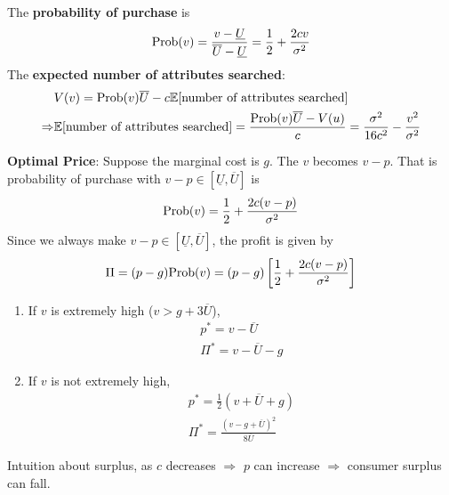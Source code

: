 \documentclass[11pt]{elegantbook}
\begin{document}
The \textbf{probability of purchase} is
\begin{equation}
    \begin{aligned}
        \textnormal{Prob}(v)=\frac{v-\underline{U}}{\overline{U}-\underline{U}}=\frac{1}{2}+\frac{2cv}{\sigma^2}
    \end{aligned}
    \nonumber
\end{equation}
The \textbf{expected number of attributes searched}:
\begin{equation}
    \begin{aligned}
        &V(v)=\textnormal{Prob}(v)\overline{U}-c \mathbb{E}[\textnormal{number of attributes searched}]\\
        \Rightarrow &\mathbb{E}[\textnormal{number of attributes searched}]=\frac{\textnormal{Prob}(v)\overline{U}-V(u)}{c}=\frac{\sigma^2}{16c^2}-\frac{v^2}{\sigma^2}
    \end{aligned}
    \nonumber
\end{equation}

\textbf{Optimal Price}: Suppose the marginal cost is $g$. The $v$ becomes $v-p$. That is probability of purchase with $v-p\in [\underline{U},\overline{U}]$ is
\begin{equation}
    \begin{aligned}
        \textnormal{Prob}(v)=\frac{1}{2}+\frac{2c(v-p)}{\sigma^2}
    \end{aligned}
    \nonumber
\end{equation}
Since we always make $v-p\in [\underline{U},\overline{U}]$, the profit is given by
\begin{equation}
    \begin{aligned}
        \Pi=(p-g)\textnormal{Prob}(v)=(p-g)\left[\frac{1}{2}+\frac{2c(v-p)}{\sigma^2}\right]
    \end{aligned}
    \nonumber
\end{equation}
\begin{enumerate}
    \item If $v$ is extremely high ($v>g+3\overline{U}$),
    \begin{equation}
        \begin{aligned}
            p^*=v-\overline{U}\\
            \Pi^*=v-\overline{U}-g
        \end{aligned}
        \nonumber
    \end{equation}
    \item If $v$ is not extremely high,
    \begin{equation}
        \begin{aligned}
            p^*=\frac{1}{2}\left(v+\overline{U}+g\right)\\
            \Pi^*=\frac{(v-g+\overline{U})^2}{8\overline{U}}
        \end{aligned}
        \nonumber
    \end{equation}
\end{enumerate}
Intuition about surplus, as $c$ decreases $\Rightarrow$ $p$ can increase $\Rightarrow$ consumer surplus can fall.
\end{document}
